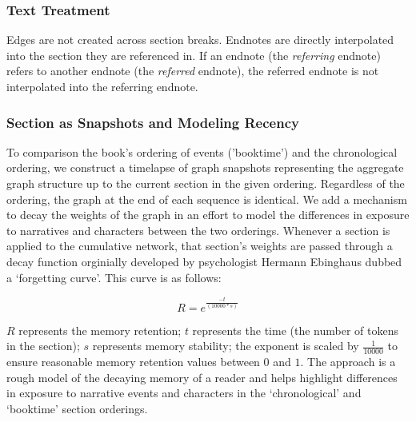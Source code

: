 \subsubsection{Text Treatment}
Edges are not created across section breaks. Endnotes are directly interpolated into the section they are referenced in. If an endnote (the \textit{referring} endnote) refers to another endnote (the \textit{referred} endnote), the referred endnote is not interpolated into the referring endnote.

\subsubsection{Section as Snapshots and Modeling Recency}
To comparison the book's ordering of events ('booktime') and the chronological ordering, we construct a timelapse of graph snapshots representing the aggregate graph structure up to the current section in the given ordering. Regardless of the ordering, the graph at the end of each sequence is identical. We add a mechanism to decay the weights of the graph in an effort to model the differences in exposure to narratives and characters between the two orderings. Whenever a section is applied to the cumulative network, that section's weights are passed through a decay function orginially developed by psychologist Hermann Ebinghaus dubbed a `forgetting curve'. This curve is as follows:

\begin{equation}
    R = e^{\frac{-t}{(10000*s)}}
\end{equation}

$R$ represents the memory retention; $t$ represents the time (the number of tokens in the section); $s$ represents memory stability; the exponent is scaled by $\frac{1}{10000}$ to ensure reasonable memory retention values between $0$ and $1$. The approach is a rough model of the decaying memory of a reader and helps highlight differences in exposure to narrative events and characters in the `chronological' and `booktime' section orderings.
